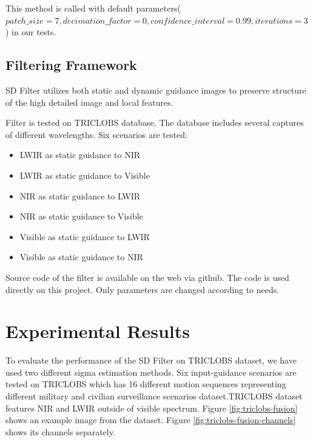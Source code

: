 \documentclass[10pt,twocolumn,letterpaper]{article}
\begin{document}
	This method is called with default parameters(\(patch\_size=7, decimation\_factor=0, confidence\_interval=0.99, iterations=3\)) in our tests.
	\subsection{Filtering Framework}\label{ss:filter-framework}
	SD Filter\cite{ham2015robust} utilizes both static and dynamic guidance images to preserve structure of the high detailed image and local features.
	
	Filter is tested on TRICLOBS\cite{triclobs} database. The database includes several captures of different wavelengths. Six scenarios are tested:
	\begin{itemize}
		\item LWIR as static guidance to NIR
		\item LWIR as static guidance to Visible
		\item NIR as static guidance to LWIR
		\item NIR as static guidance to Visible
		\item Visible as static guidance to LWIR
		\item Visible as static guidance to NIR
	\end{itemize}
	
	Source code of the filter is available on the web via github\cite{github:sdfilter}. The code is used directly on this project. Only parameters are changed according to needs.
	
	\section{Experimental Results}
	
	To evaluate the performance of the SD Filter\cite{ham2015robust} on TRICLOBS\cite{triclobs} dataset, we have used two different sigma estimation methods. Six input-guidance scenarios are tested on TRICLOBS which has  16 different motion sequences representing different military and civilian surveillance scenarios dataset.TRICLOBS dataset features NIR and LWIR outside of visible spectrum. Figure \ref{fig:triclobs-fusion} shows an example image from the dataset. Figure \ref{fig:triclobs-fusion-channels} shows its channels separately.
	
\end{document}
